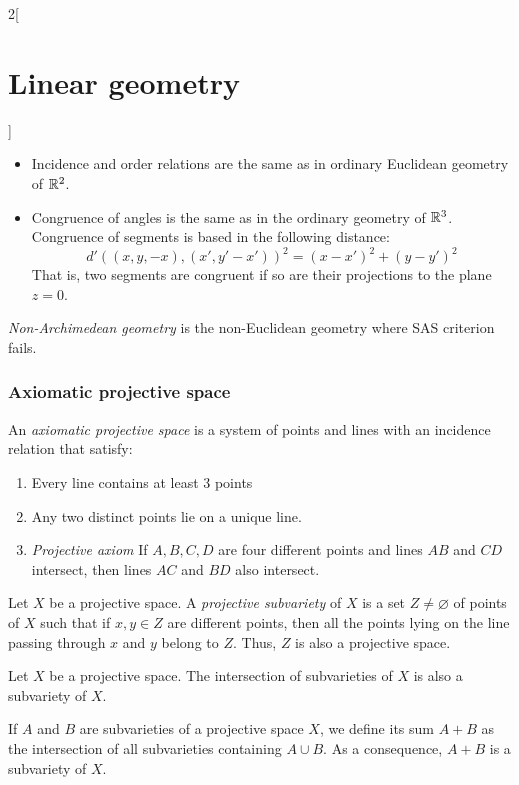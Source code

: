\documentclass[../../../main.tex]{subfiles}
\begin{document}
\begin{multicols}{2}[\section{Linear geometry}]
\begin{proposition}
\begin{itemize}
      \item Incidence and order relations are the same as in ordinary Euclidean geometry of $\mathbb{R}^2$.
      \item Congruence of angles is the same as in the ordinary geometry of $\mathbb{R}^3$. Congruence of segments is based in the following distance:  $${d'((x,y,-x),(x',y'-x'))}^2=(x-x')^2+{(y-y')}^2$$ That is, two segments are congruent if so are their projections to the plane $z=0$.
    \end{itemize}
  \end{proposition}
  \begin{definition}
    \emph{Non-Archimedean geometry} is the non-Euclidean geometry where SAS criterion fails.
  \end{definition}
  \subsubsection{Axiomatic projective space}
  \begin{definition}
    An \emph{axiomatic projective space} is a system of points and lines with an incidence relation that satisfy:
    \begin{enumerate}
      \item Every line contains at least 3 points
      \item Any two distinct points lie on a unique line.
      \item \emph{Projective axiom} If $A,B,C,D$ are four different points and lines $AB$ and $CD$ intersect, then lines $AC$ and $BD$ also intersect.
    \end{enumerate}
  \end{definition}
  \begin{definition}
    Let $X$ be a projective space. A \emph{projective subvariety} of $X$ is a set $Z\ne\varnothing$ of points of $X$ such that if $x,y\in Z$ are different points, then all the points lying on the line passing through $x$ and $y$ belong to $Z$. Thus, $Z$ is also a projective space.
  \end{definition}
  \begin{proposition}
    Let $X$ be a projective space. The intersection of subvarieties of $X$ is also a subvariety of $X$.
  \end{proposition}
  \begin{proposition}
    If $A$ and $B$ are subvarieties of a projective space $X$, we define its sum $A+B$ as the intersection of all subvarieties containing $A\cup B$. As a consequence, $A+B$ is a subvariety of $X$.

\end{proposition}
\end{multicols}
\end{document}

